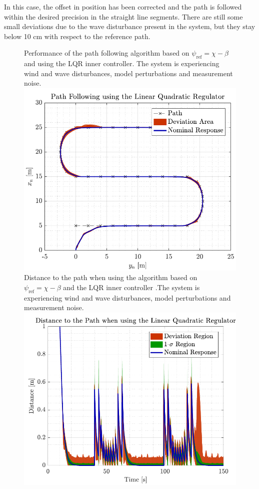 In this case, the offset in position has been corrected and the path is followed within the desired precision in the straight line segments. There are still some small deviations due to the wave disturbance present in the system, but they stay below 10 cm with respect to the reference path.
\begin{figure}[H]
	\captionbox  %
	{               %
		Performance of the path following algorithm based on $\psi_\mathrm{ref}=\chi-\beta$ and using the LQR inner controller. The system is experiencing wind and wave disturbances, model perturbations and measurement noise.                %
		\label{fig:lrqcorrect}                                  %
	}                                                                 %
	{                                                                  %
		\includegraphics[width=.45\textwidth]{figures/path_lqr}         %
	}                                                                    %
	\hspace{5pt}                                                          %
	\captionbox  %
	{       
			Distance to the path when using the algorithm based on $\psi_\mathrm{ref}=\chi-\beta$ and the LQR inner controller .The system is experiencing wind and wave disturbances, model perturbations and measurement noise.                                                                  %
		\label{fig:distlqr}                                     %
	}                                                                           %
	{                                                                            %
		\includegraphics[width=.45\textwidth]{figures/dist_lqr}            %
	}                                                                             %
\end{figure}

